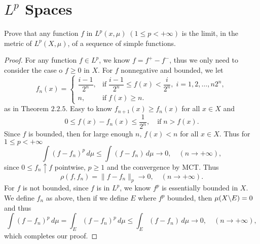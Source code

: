 \section{$L^p$ Spaces}
\begin{pro}%
	Prove that any function $f$ in $L^p(x,\mu)\;(1\leq p<+\infty)$ is the limit, in the metric of $L^p(X,\mu)$, of a sequence of simple functions.
\end{pro}
\begin{proof}
	For any function $f\in L^p$, we know $f=f^+-f^-$, thus we only need to consider the case o $f\geq 0$ in $X$. For $f$ nonnegative and bounded, we let
	\[f_n(x)=\begin{cases}
	\dfrac{i-1}{2^n},&\mbox{if}\;\dfrac{i-1}{2^n}\leq f(x)< \dfrac{i}{2^n},\;i=1,2,\dots,n2^n,\\
	n,&\mbox{if}\;f(x)\geq n.\end{cases}\]
	as in Theorem $2.2.5$. Easy to know $f_{n+1}(x)\geq f_n(x)$ for all $x\in X$ and 
	\[0\leq f(x)-f_n(x)\leq \frac{1}{2^n},\quad\mbox{if}\;n>f(x).\]
	Since $f$ is bounded, then for large enough $n$, $f(x)< n$ for all $x\in X$. Thus for $1\leq p<+\infty$
	\[\int (f-f_n)^p\,d\mu\leq \int (f-f_n)\,d\mu\to 0,\quad(n\to+\infty),\]
	since $0\leq f_n\uparrow f$ pointwise, $p\geq 1$ and the convergence by MCT. Thus
	\[\rho(f,f_n)=\|f-f_n\|_p\to 0,\quad (n\to +\infty).\]
	For $f$ is not bounded, since $f$ is in $L^p$, we know $f^p$ is essentially bounded in $X$. We define $f_n$ as above, then if we define $E$ where $f^p$ bounded, then $\mu(X\backslash E)=0$ and thus
	\[\int (f-f_n)^p\,d\mu=\int_E (f-f_n)^p\,d\mu\leq \int_E (f-f_n)\,d\mu\to 0,\quad(n\to+\infty),\]
	which completes our proof.
\end{proof}

